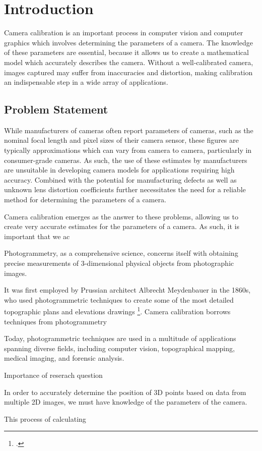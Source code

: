 \section{Introduction}

Camera calibration is an important process in computer vision and computer graphics which involves determining the parameters of a camera. The knowledge of these parameters are essential, because it allows us to create a mathematical model which accurately describes the camera. Without a well-calibrated camera, images captured may suffer from inaccuracies and distortion, making calibration an indispensable step in a wide array of applications.

\subsection{Problem Statement}

While manufacturers of cameras often report parameters of cameras, such as the nominal focal length and pixel sizes of their camera sensor, these figures are typically approximations which can vary from camera to camera, particularly in consumer-grade cameras. As such, the use of these estimates by manufacturers are unsuitable in developing camera models for applications requiring high accuracy. Combined with the potential for manufacturing defects as well as unknown lens distortion coefficients further necessitates the need for a reliable method for determining the parameters of a camera. 

Camera calibration emerges as the answer to these problems, allowing us to create very accurate estimates for the parameters of a camera. As such, it is important that we ac

Photogrammetry, as a comprehensive science, concerns itself with obtaining precise measurements of 3-dimensional physical objects from photographic images. 

It was first employed by Prussian architect Albrecht Meydenbauer in the 1860s, who used photogrammetric techniques to create some of the most detailed topographic plans and elevations drawings \footcite{albertzLookBack2007}. 
Camera calibration borrows techniques from photogrammetry  

Today, photogrammetric techniques are used in a multitude of applications spanning diverse fields, including computer vision, topographical mapping, medical imaging, and forensic analysis. 



Importance of reserach question

In order to accurately determine the position of 3D points based on data from multiple 2D images, we must have knowledge of the parameters of the camera.

This process of calculating








